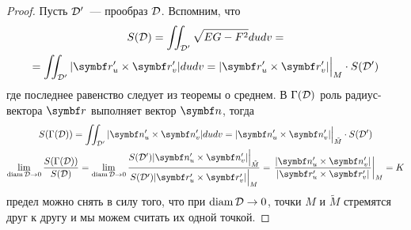 \documentclass[main]{subfiles}
\begin{document}
\begin{proof}
    Пусть $\mathcal{D}'$~--- прообраз $\mathcal{D}$.
    Вспомним, что
    \begin{multline*}
        S(\fancyD) = \iint_{\fancyD'} \sqrt{EG-F^2} dudv = \\
        = \iint_{\fancyD'}|\vr'_u \times \vr'_v| dudv = |\vr'_u \times \vr'_v|\Big|_{M} \cdot S(\fancyD')
    \end{multline*}
    где последнее равенство следует из теоремы о среднем.
    В $\Gamma(\mathcal{D})$ роль радиус-вектора $\vr$ выполняет вектор $\vn$, тогда
    \begin{gather*}
        S(\Gamma(\fancyD)) = \iint_{\fancyD'} |\vn'_u \times \vn'_v|dudv =  |\vn'_u \times \vn'_v|\Big|_{\tilde{M}} \cdot S(\fancyD')\\
        \lim_{\diam \fancyD \to 0} \frac{S(\Gamma(\fancyD))}{S(\fancyD)} =
        \lim_{\diam \fancyD \to 0}  \frac{S(\fancyD')|\vn'_u \times \vn'_v| \Big|_{\tilde{M}}}{S(\fancyD')|\vr'_u \times \vr'_v|\Big|_{M} } =
        \left.\frac{|\vn'_u \times \vn'_v|}{|\vr'_u \times \vr'_v|}\right|_M = K
    \end{gather*}
    предел можно снять в силу того, что при $\operatorname{diam} \mathcal{D} \to 0$, точки $M$ и $\tilde{M}$ стремятся друг к другу и мы можем считать их одной точкой.
\end{proof}
\end{document}
